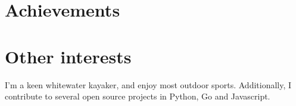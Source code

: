 \documentclass[11pt,a4paper, roman]{moderncv} %
\begin{document}
\section{Achievements}

\section{Other interests}
I'm a keen whitewater kayaker, and enjoy most outdoor sports. Additionally, I contribute to several open source projects in Python, Go and Javascript.





























\end{document}
